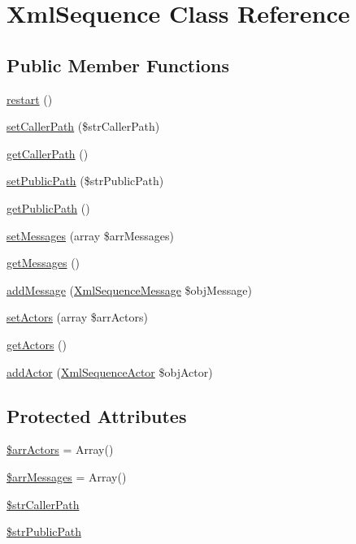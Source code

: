 \hypertarget{class_xml_sequence}{
\section{XmlSequence Class Reference}
\label{class_xml_sequence}
}
\subsection*{Public Member Functions}
\begin{CompactItemize}
\item 
\hyperlink{class_xml_sequence_953da102372c3cd12f7dfe7fb2f01bbd}{restart} ()
\item 
\hyperlink{class_xml_sequence_2b5e654d8a5559dc263da2d3bdbd043e}{setCallerPath} (\$strCallerPath)
\item 
\hyperlink{class_xml_sequence_197ff62ed0c4d22324218206147f25e4}{getCallerPath} ()
\item 
\hyperlink{class_xml_sequence_1b463d4b176c4798b8be4667262f0450}{setPublicPath} (\$strPublicPath)
\item 
\hyperlink{class_xml_sequence_156bcaa4792dca6a381621d68052ba32}{getPublicPath} ()
\item 
\hyperlink{class_xml_sequence_3cf549fbc588fc2bc0bbd74f818dfe91}{setMessages} (array \$arrMessages)
\item 
\hyperlink{class_xml_sequence_21cc38a9b7b19954bb0b8951b065ad11}{getMessages} ()
\item 
\hyperlink{class_xml_sequence_f46e383dc5728d4b072ac8299417dfed}{addMessage} (\hyperlink{class_xml_sequence_message}{XmlSequenceMessage} \$objMessage)
\item 
\hyperlink{class_xml_sequence_00aa28e395a3d00b7b15b1adebe092db}{setActors} (array \$arrActors)
\item 
\hyperlink{class_xml_sequence_dcce8335021177bac08889348f2a508e}{getActors} ()
\item 
\hyperlink{class_xml_sequence_4dcdb7d52d39bbdb4b9897c61570a064}{addActor} (\hyperlink{class_xml_sequence_actor}{XmlSequenceActor} \$objActor)
\end{CompactItemize}
\subsection*{Protected Attributes}
\begin{CompactItemize}
\item 
\hyperlink{class_xml_sequence_32c07693b6fb096943d6594bc198840d}{\$arrActors} = Array()
\item 
\hyperlink{class_xml_sequence_49575b42830f5ce6152e1cc4e2d934f3}{\$arrMessages} = Array()
\item 
\hyperlink{class_xml_sequence_81ff70d1bae4303f0454e8f76897cde7}{\$strCallerPath}
\item 
\hyperlink{class_xml_sequence_5a3049f005498d02e15be8e67c759ea1}{\$strPublicPath}
\end{CompactItemize}


